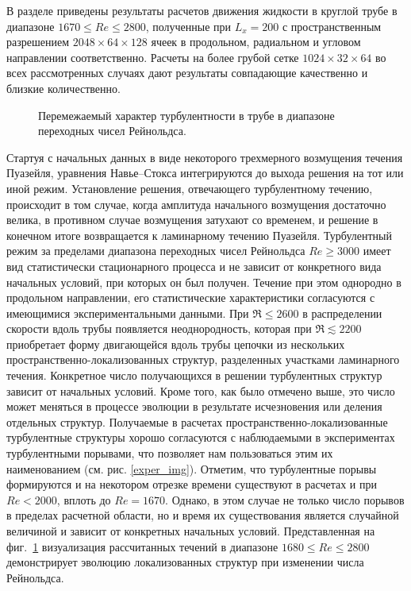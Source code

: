 В разделе приведены результаты расчетов движения жидкости в круглой трубе в диапазоне $1670\leqslant Re\leqslant 2800$, полученные при $L_x=200$ с пространственным разрешением $2048 \times 64 \times 128$ ячеек в продольном, радиальном и угловом направлении соответственно. Расчеты на более грубой сетке $1024\times32\times64$ во всех рассмотренных случаях дают результаты совпадающие качественно и близкие количественно.

\begin{figure}[h]
\caption{Перемежаемый характер турбулентности в трубе в диапазоне переходных чисел Рейнольдса.}
\label{puffs_img}
\end{figure}

Стартуя с начальных данных в виде некоторого трехмерного возмущения течения Пуазейля, уравнения Навье--Стокса интегрируются до выхода решения на тот или иной режим. Установление решения, отвечающего турбулентному течению, происходит в том случае, когда амплитуда начального возмущения достаточно велика, в противном случае возмущения затухают со временем, и решение в конечном итоге возвращается к ламинарному течению Пуазейля. Турбулентный режим за пределами диапазона переходных чисел Рейнольдса $Re\geqslant3000$ имеет вид статистически стационарного процесса и не зависит от конкретного вида начальных условий, при которых он был получен. Течение при этом однородно в продольном направлении, его статистические характеристики согласуются с имеющимися экспериментальными данными. При $\Re\leqslant2600$ в распределении скорости вдоль трубы появляется неоднородность, которая при $\Re\lesssim2200$ приобретает форму двигающейся вдоль трубы цепочки из нескольких пространственно-локализованных структур, разделенных участками ламинарного течения. Конкретное число получающихся в решении турбулентных структур зависит от начальных условий. Кроме того, как было отмечено выше, это число может меняться в процессе эволюции в результате исчезновения или деления отдельных структур. Получаемые в расчетах пространственно-локализованные турбулентные структуры хорошо согласуются с наблюдаемыми в экспериментах турбулентными порывами, что позволяет нам пользоваться этим их наименованием (см. рис. \ref{exper_img}). Отметим, что турбулентные порывы формируются и на некотором отрезке времени существуют в расчетах и при $Re<2000$, вплоть до $Re=1670$. Однако, в этом случае не только число порывов в пределах расчетной области, но и время их существования является случайной величиной и зависит от конкретных начальных условий. Представленная на фиг.~\ref{puffs_img} визуализация рассчитанных течений в диапазоне $1680\leqslant Re\leqslant2800$ демонстрирует эволюцию локализованных структур при изменении числа Рейнольдса.

